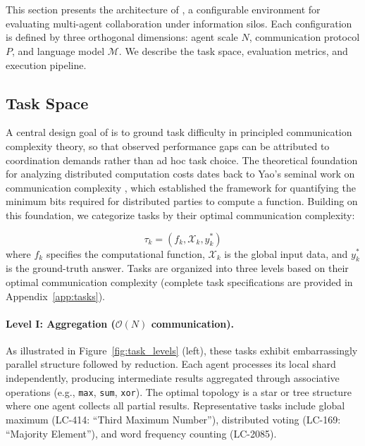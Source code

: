 \section{\silobench{}}
\label{sec:benchmark}

This section presents the architecture of \silobench{}, a configurable environment for evaluating multi-agent collaboration under information silos. 
Each configuration is defined by three orthogonal dimensions: agent scale $N$, communication protocol $P$, and language model $\mathcal{M}$. We describe the task space, evaluation metrics, and execution pipeline.

\subsection{Task Space}
\label{sec:task_space}

A central design goal of \silobench{} is to ground task difficulty in principled communication complexity theory, so that observed performance gaps can be attributed to coordination demands rather than ad hoc task choice. 
The theoretical foundation for analyzing distributed computation costs dates back to Yao's seminal work on communication complexity \citep{yao1979some}, which established the framework for quantifying the minimum bits required for distributed parties to compute a function. 
Building on this foundation, we categorize tasks by their optimal communication complexity:

\begin{equation}
\tau_k = (f_k, \mathcal{X}_k, y^*_k)
\label{eq:task_def}
\end{equation}
where $f_k$ specifies the computational function, $\mathcal{X}_k$ is the global input data, and $y^*_k$ is the ground-truth answer. 
Tasks are organized into three levels based on their optimal communication complexity (complete task specifications are provided in Appendix~\ref{app:tasks}).

\paragraph{Level I: Aggregation ($\mathcal{O}(N)$ communication).}
As illustrated in Figure~\ref{fig:task_levels} (left), these tasks exhibit embarrassingly parallel structure followed by reduction. 
Each agent processes its local shard independently, producing intermediate results aggregated through associative operations (e.g., \texttt{max}, \texttt{sum}, \texttt{xor}). 
The optimal topology is a star or tree structure where one agent collects all partial results. 
Representative tasks include global maximum (LC-414: ``Third Maximum Number''), distributed voting (LC-169: ``Majority Element''), and word frequency counting (LC-2085).

